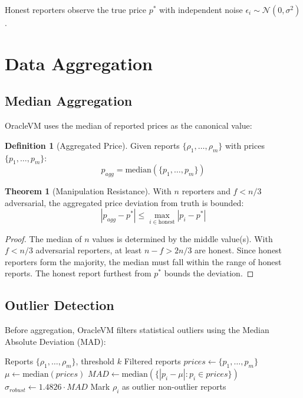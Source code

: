 \documentclass[11pt,a4paper]{article}
\theoremstyle{definition}
\newtheorem{definition}{Definition}
\newtheorem{theorem}{Theorem}
\begin{document}
Honest reporters observe the true price $p^*$ with independent noise $\epsilon_i \sim \mathcal{N}(0, \sigma^2)$.

\section{Data Aggregation}

\subsection{Median Aggregation}

OracleVM uses the median of reported prices as the canonical value:

\begin{definition}[Aggregated Price]
Given reports $\{\rho_1, \ldots, \rho_m\}$ with prices $\{p_1, \ldots, p_m\}$:
\[
p_{agg} = \text{median}(\{p_1, \ldots, p_m\})
\]
\end{definition}

\begin{theorem}[Manipulation Resistance]
With $n$ reporters and $f < n/3$ adversarial, the aggregated price deviation from truth is bounded:
\[
|p_{agg} - p^*| \leq \max_{i \in \text{honest}} |p_i - p^*|
\]
\end{theorem}

\begin{proof}
The median of $n$ values is determined by the middle value(s). With $f < n/3$ adversarial reporters, at least $n - f > 2n/3$ are honest. Since honest reporters form the majority, the median must fall within the range of honest reports. The honest report furthest from $p^*$ bounds the deviation.
\end{proof}

\subsection{Outlier Detection}

Before aggregation, OracleVM filters statistical outliers using the Median Absolute Deviation (MAD):

\begin{algorithm}
\caption{Outlier Detection}
\begin{algorithmic}[1]
\Require Reports $\{\rho_1, \ldots, \rho_m\}$, threshold $k$
\Ensure Filtered reports
\State $prices \gets \{p_1, \ldots, p_m\}$
\State $\mu \gets \text{median}(prices)$
\State $MAD \gets \text{median}(\{|p_i - \mu| : p_i \in prices\})$
\State $\sigma_{robust} \gets 1.4826 \cdot MAD$ 
        \State Mark $\rho_i$ as outlier
    \EndIf
\EndFor
\State \Return non-outlier reports
\end{algorithmic}
\end{algorithm}
\end{document}

